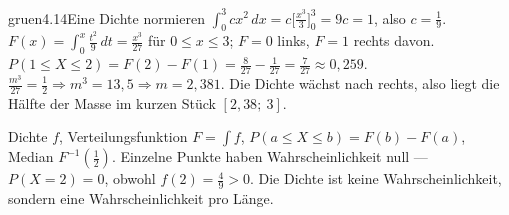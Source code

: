 \begin{loesungkarte}{gruen}{4.14}{Eine Dichte normieren}
$\int_0^3cx^{2}\,dx = c\bigl[\frac{x^{3}}3\bigr]_0^3 = 9c = 1$, also $c = \frac19$.
$F(x) = \int_0^x\frac{t^{2}}9\,dt = \frac{x^{3}}{27}$ für $0\le x\le3$; $F = 0$ links, $F = 1$ rechts davon.
$P(1\le X\le2) = F(2) - F(1) = \frac8{27} - \frac1{27} = \frac7{27}\approx0{,}259$.
$\frac{m^{3}}{27} = \frac12\Rightarrow m^{3} = 13{,}5\Rightarrow m = 2{,}381$. Die Dichte wächst nach rechts, also liegt die Hälfte der Masse im kurzen Stück $[2{,}38;\ 3]$.
\begin{mitnehmen}\kastentext
Dichte $f$, Verteilungsfunktion $F = \int f$, $P(a\le X\le b) = F(b) - F(a)$, Median $F^{-1}(\frac12)$. Einzelne Punkte haben Wahrscheinlichkeit null --- $P(X = 2) = 0$, obwohl $f(2) = \frac49 > 0$. Die Dichte ist keine Wahrscheinlichkeit, sondern eine Wahrscheinlichkeit pro Länge.
\end{mitnehmen}
\end{loesungkarte}

